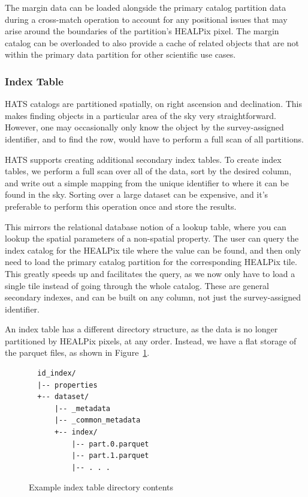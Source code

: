 \documentclass[11pt,a4paper]{ivoa}
\begin{document}
The margin data can be loaded alongside the primary catalog partition data during a cross-match operation to account for any positional issues that may arise around the boundaries of the partition's HEALPix pixel.
The margin catalog can be overloaded to also provide a cache of related objects that are not within the primary data partition for other scientific use cases.

\subsubsection{Index Table} \label{sec:index}

HATS catalogs are partitioned spatially, on right ascension and declination. 
This makes finding objects in a particular area of the sky very straightforward. 
However, one may occasionally only know the object by the survey-assigned identifier, and to find the row, would have to perform a full scan of all partitions. \par

HATS supports creating additional secondary index tables. 
To create index tables, we perform a full scan over all of the data, sort by the desired column, and write out a simple mapping from the unique identifier to where it can be found in the sky.
Sorting over a large dataset can be expensive, and it's preferable to perform this operation once and store the results. \par

This mirrors the relational database notion of a lookup table, where you can lookup the spatial parameters of a non-spatial property.
The user can query the index catalog for the HEALPix tile where the value can be found, and then only need to load the primary catalog partition for the corresponding HEALPix tile. 
This greatly speeds up and facilitates the query, as we now only have to load a single tile instead of going through the whole catalog.
These are general secondary indexes, and can be built on any column, not just the survey-assigned identifier. \par

An index table has a different directory structure, as the data is no longer partitioned by HEALPix pixels, at any order.
Instead, we have a flat storage of the parquet files, as shown in Figure~\ref{fig:exampleIndexStructure}.

\begin{figure}
\begin{minipage}{\linewidth}
  \begin{lstlisting}
  id_index/
  |-- properties
  +-- dataset/
      |-- _metadata
      |-- _common_metadata
      +-- index/
          |-- part.0.parquet
          |-- part.1.parquet
          |-- . . .
  \end{lstlisting}
\end{minipage}
\caption{Example index table directory contents}
\label{fig:exampleIndexStructure}
\end{figure}
\end{document}
